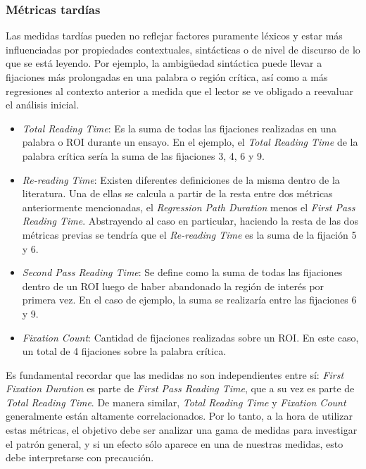 \subsubsection{Métricas tardías}

Las medidas tardías pueden no reflejar factores puramente léxicos y estar más influenciadas por propiedades contextuales, sintácticas o de nivel de discurso de lo que se está leyendo. Por ejemplo, la ambigüedad sintáctica puede llevar a fijaciones más prolongadas en una palabra o región crítica, así como a más regresiones al contexto anterior a medida que el lector se ve obligado a reevaluar el análisis inicial. \parencite{FrazierRayner1982}

\begin{itemize}
    \item \textit{Total Reading Time}: Es la suma de todas las fijaciones realizadas en una palabra o ROI durante un ensayo. En el ejemplo, el \textit{Total Reading Time} de la palabra crítica sería la suma de las fijaciones 3, 4, 6 y 9.
    \item \textit{Re-reading Time}: Existen diferentes definiciones de la misma dentro de la literatura. Una de ellas se calcula a partir de la resta entre dos métricas anteriormente mencionadas, el \textit{Regression Path Duration} menos el \textit{First Pass Reading Time}. Abstrayendo al caso en particular, haciendo la resta de las dos métricas previas se tendría que el \textit{Re-reading Time} es la suma de la fijación 5 y 6.
    \item \textit{Second Pass Reading Time}: Se define como la suma de todas las fijaciones dentro de un ROI luego de haber abandonado la región de interés por primera vez. En el caso de ejemplo, la suma se realizaría entre las fijaciones 6 y 9.
    \item \textit{Fixation Count}: Cantidad de fijaciones realizadas sobre un ROI. En este caso, un total de 4 fijaciones sobre la palabra crítica.
\end{itemize}

Es fundamental recordar que las medidas no son independientes entre sí: \textit{First Fixation Duration} es parte de \textit{First Pass Reading Time}, que a su vez es parte de \textit{Total Reading Time}. De manera similar, \textit{Total Reading Time} y \textit{Fixation Count} generalmente están altamente correlacionados. Por lo tanto, a la hora de utilizar estas métricas, el objetivo debe ser analizar una gama de medidas para investigar el patrón general, y si un efecto sólo aparece en una de nuestras medidas, esto debe interpretarse con precaución.

